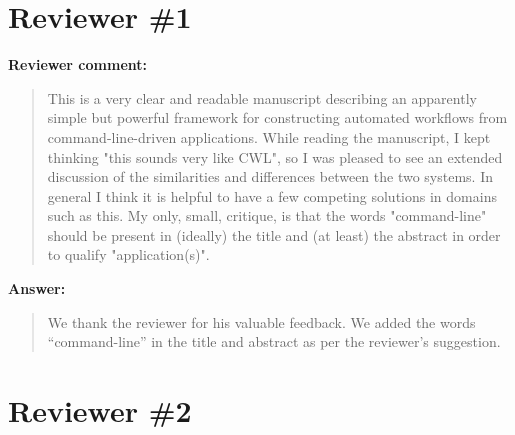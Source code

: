 \documentclass[a4]{article}
\newenvironment{review}%
{\textbf{Reviewer comment:}\begin{quote}}%
{\end{quote}}%
\newenvironment{answer}%
{\textbf{Answer:}\begin{quote}}%
{\end{quote}}%
\begin{document}
\section{Reviewer \#1}

\begin{review}
This is a very clear and readable manuscript describing an apparently
simple but powerful framework for constructing automated workflows
from command-line-driven applications. While reading the manuscript, I
kept thinking "this sounds very like CWL", so I was pleased to see an
extended discussion of the similarities and differences between the
two systems. In general I think it is helpful to have a few competing
solutions in domains such as this. My only, small, critique, is that
the words "command-line" should be present in (ideally) the title and
(at least) the abstract in order to qualify "application(s)".
\end{review}

\begin{answer}
We thank the reviewer for his valuable feedback. We added the words
``command-line'' in the title and abstract as per the reviewer's
suggestion.
\end{answer}

\section{Reviewer \#2}
\end{document}
